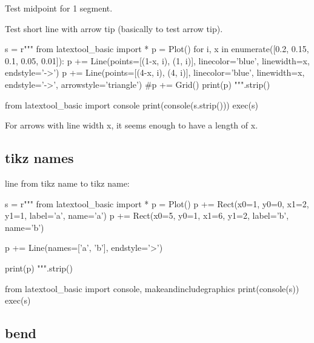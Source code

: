 \newpage

Test midpoint for 1 segment.


\newpage
Test short line with arrow tip (basically to test arrow tip).
\begin{python}
s = r"""
from latextool_basic import *
p = Plot()
for i, x in enumerate([0.2, 0.15, 0.1, 0.05, 0.01]):
    p += Line(points=[(1-x, i), (1, i)], linecolor='blue', linewidth=x, 
              endstyle='->')    
    p += Line(points=[(4-x, i), (4, i)], linecolor='blue', linewidth=x, 
              endstyle='->', arrowstyle='triangle')    
#p += Grid()
print(p)
""".strip()

from latextool_basic import console
print(console(s.strip()))
exec(s)
\end{python}

For arrows with line width x, it seems enough to have a length of x.



\newpage
\subsection{tikz names}
line from tikz name to tikz name:

\begin{python}
s = r"""
from latextool_basic import *
p = Plot()
p += Rect(x0=1, y0=0, x1=2, y1=1, label='a', name='a')
p += Rect(x0=5, y0=1, x1=6, y1=2, label='b', name='b')

p += Line(names=['a', 'b'], endstyle='>')

print(p)
""".strip()

from latextool_basic import console, makeandincludegraphics
print(console(s))
exec(s)
\end{python}



\newpage
\subsection{bend}

